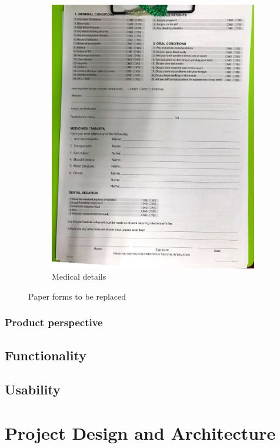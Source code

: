 \documentclass[11 pt]{article}
\begin{document}
\begin{figure}
\begin{subfigure}{.6\textwidth}
  \includegraphics[width=1.2\linewidth]{patient_paper_form_med.jpeg}
  \caption{Medical details}
  \label{fig:sub2}
\end{subfigure}
\caption{Paper forms to be replaced}
\label{fig:test}
\end{figure}
\subsubsection{Product perspective}

\subsection{Functionality}
\subsection{Usability}
\newpage   
\section{Project Design and Architecture}
 
\end{document}
